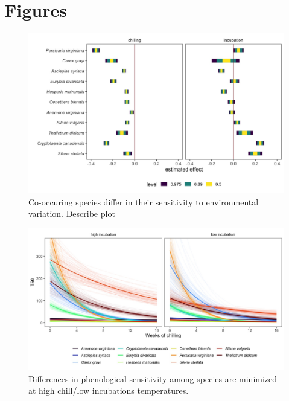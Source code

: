 \documentclass{article}[12pt]
\begin{document}
\begin{enumerate}
\begin{enumerate}
\end{enumerate}
\pagebreak
\section*{Figures}
\begin{figure}[h!]
  \centering
 \includegraphics[width=\textwidth]{..//plots/mus_survival.jpeg}
    \caption{Co-occuring species differ in their sensitivity to environmental variation. Describe plot}
    \label{Fig:emp}
\end{figure}


\begin{figure}[h!]
  \centering
 \includegraphics[width=\textwidth]{..//plots/surv_prieff.jpeg}
    \caption{Differences in phenological sensitivity among species are minimized at high chill/low incubations temperatures.}
    \label{Fig:surv}
\end{figure}



\end{enumerate}
\end{document}
